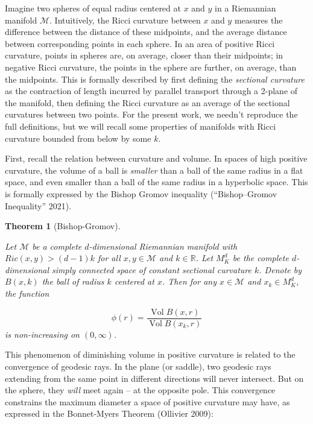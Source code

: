 \documentclass[
  letterpaper,
  DIV=11,
  numbers=noendperiod]{scrartcl}
\theoremstyle{plain}
\newtheorem{theorem}{Theorem}[section]
\theoremstyle{plain}
\theoremstyle{definition}
\theoremstyle{plain}
\theoremstyle{definition}
\theoremstyle{remark}
\begin{document}
Imagine two spheres of equal radius centered at \(x\) and \(y\) in a
Riemannian manifold \(\mathcal{M}\). Intuitively, the Ricci curvature
between \(x\) and \(y\) measures the difference between the distance of
these midpoints, and the average distance between corresponding points
in each sphere. In an area of positive Ricci curvature, points in
spheres are, on average, closer than their midpoints; in negative Ricci
curvature, the points in the sphere are further, on average, than the
midpoints. This is formally described by first defining the
\emph{sectional curvature} as the contraction of length incurred by
parallel transport through a 2-plane of the manifold, then defining the
Ricci curvature as an average of the sectional curvatures between two
points. For the present work, we needn't reproduce the full definitions,
but we will recall some properties of manifolds with Ricci curvature
bounded from below by some \(k\).

First, recall the relation between curvature and volume. In spaces of
high positive curvature, the volume of a ball is \emph{smaller} than a
ball of the same radius in a flat space, and even smaller than a ball of
the same radius in a hyperbolic space. This is formally expressed by the
Bishop Gromov inequality ({``Bishop--{Gromov} Inequality''} 2021).

\begin{theorem}[Bishop-Gromov]\protect\hypertarget{thm-bishop-gromov}{}\label{thm-bishop-gromov}

Let \(\mathcal{M}\) be a complete \(d\)-dimensional Riemannian manifold
with \(Ric(x,y) > (d - 1)k\) for all \(x,y \in \mathcal{M}\) and
\(k \in \mathbb{R}\). Let \(M_{K}^d\) be the complete \(d\)-dimensional
simply connected space of constant sectional curvature \(k\). Denote by
\(B(x,k)\) the ball of radius \(k\) centered at \(x\). Then for any
\(x \in \mathcal{M}\) and \(x_{k} \in M_{K}^d\), the function

\[
\phi(r) = \frac{\operatorname{Vol}B(x,r)}{\operatorname{Vol}B(x_{k},r)}
\] is non-increasing on \((0,\infty)\).

\end{theorem}

This phenomenon of diminishing volume in positive curvature is related
to the convergence of geodesic rays. In the plane (or saddle), two
geodesic rays extending from the same point in different directions will
never intersect. But on the sphere, they \emph{will} meet again -- at
the opposite pole. This convergence constrains the maximum diameter a
space of positive curvature may have, as expressed in the Bonnet-Myers
Theorem (Ollivier 2009):
\end{document}
